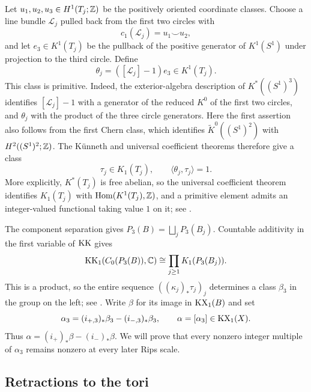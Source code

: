 Let $u_1,u_2,u_3\in H^1(T_j;\mathbb Z)$ be the positively oriented coordinate
classes. Choose a line bundle $\mathcal L_j$ pulled back from the first
two circles with
\[
 c_1(\mathcal L_j)=u_1\smile u_2,
\]
and let $e_3\in K^1(T_j)$ be the pullback of the positive generator of
$K^1(S^1)$ under projection to the third circle. Define
\begin{equation}
 \theta_j=([\mathcal L_j]-1)e_3\in K^1(T_j).
 \label{top:theta}
\end{equation}
This class is primitive. Indeed, the exterior-algebra description of
$K^*((S^1)^3)$ identifies $[\mathcal L_j]-1$ with a generator of the
reduced $K^0$ of the first two circles, and $\theta_j$ with the product
of the three circle generators. Here the first assertion also follows
from the first Chern class, which identifies
$\widetilde K^0((S^1)^2)$ with $H^2((S^1)^2;\mathbb Z)$.
The K\"unneth and universal coefficient theorems therefore give a class
\begin{equation}
 \tau_j\in K_1(T_j),\qquad
 \langle\theta_j,\tau_j\rangle=1.
 \label{top:tau}
\end{equation}
More explicitly, $K^*(T_j)$ is free abelian, so the universal
coefficient theorem identifies $K_1(T_j)$ with
$\operatorname{Hom}(K^1(T_j),\mathbb Z)$, and a primitive element admits an
integer-valued functional taking value $1$ on it; see
\cite[Theorems 23.1.1 and 23.1.3]{Blackadar98}.

The component separation gives
$P_3(B)=\bigsqcup_jP_3(B_j)$. Countable additivity in the first variable
of $\operatorname{KK}$ gives
\begin{equation}
 \operatorname{KK}_1(C_0(P_3(B)),\mathbb C)
 \cong\prod_{j\geq1}K_1(P_3(B_j)).
 \label{top:kk-product}
\end{equation}
This is a product, so the entire sequence
$((\kappa_j)_*\tau_j)_j$ determines a class $\beta_3$ in the group on
the left; see \cite[Theorem 19.7.1]{Blackadar98}. Write $\beta$ for its
image in $\operatorname{KX}_1(B)$ and set
\begin{equation}
 \alpha_3=(i_{+,3})_*\beta_3-(i_{-,3})_*\beta_3,
 \qquad
 \alpha=[\alpha_3]\in\operatorname{KX}_1(X).
 \label{top:alpha}
\end{equation}
Thus $\alpha=(i_+)_*\beta-(i_-)_*\beta$. We will prove that every
nonzero integer multiple of $\alpha_3$ remains nonzero at every later
Rips scale.

\subsection{Retractions to the tori}

